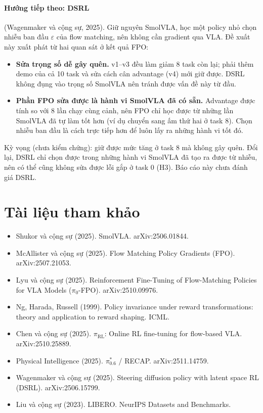 \documentclass[10pt,a4paper]{article}
\begin{document}
\paragraph{Hướng tiếp theo: DSRL} (Wagenmaker và cộng sự, 2025). Giữ nguyên SmolVLA, học một policy nhỏ chọn nhiễu ban đầu
$\varepsilon$ của flow matching, nên không cần gradient qua VLA. Đề xuất này xuất phát từ hai quan sát ở kết quả FPO:
\begin{itemize}
\item \textbf{Sửa trọng số dễ gây quên.} v1--v3 đều làm giảm 8 task còn lại; phải thêm demo của cả 10 task và sửa cách
cân advantage (v4) mới giữ được. DSRL không đụng vào trọng số SmolVLA nên tránh được vấn đề này từ đầu.
\item \textbf{Phần FPO sửa được là hành vi SmolVLA đã có sẵn.} Advantage được tính so với 8 lần chạy cùng cảnh, nên FPO
chỉ học được từ những lần SmolVLA đã tự làm tốt hơn (ví dụ chuyển sang ấm thứ hai ở task 8). Chọn nhiễu ban đầu là cách
trực tiếp hơn để luôn lấy ra những hành vi tốt đó.
\end{itemize}
Kỳ vọng (chưa kiểm chứng): giữ được mức tăng ở task 8 mà không gây quên. Đổi lại, DSRL chỉ chọn được trong những hành vi
SmolVLA đã tạo ra được từ nhiễu, nên có thể cũng không sửa được lỗi gắp ở task 0 (H3). Báo cáo này chưa đánh giá DSRL.


\section*{Tài liệu tham khảo}
{\scriptsize\raggedright
\begin{itemize}
\item Shukor và cộng sự (2025). SmolVLA. arXiv:2506.01844.
\item McAllister và cộng sự (2025). Flow Matching Policy Gradients (FPO). arXiv:2507.21053.
\item Lyu và cộng sự (2025). Reinforcement Fine-Tuning of Flow-Matching Policies for VLA Models ($\pi_0$-FPO). arXiv:2510.09976.
\item Ng, Harada, Russell (1999). Policy invariance under reward transformations: theory and application to reward shaping. ICML.
\item Chen và cộng sự (2025). $\pi_{\text{RL}}$: Online RL fine-tuning for flow-based VLA. arXiv:2510.25889.
\item Physical Intelligence (2025). $\pi^*_{0.6}$ / RECAP. arXiv:2511.14759.
\item Wagenmaker và cộng sự (2025). Steering diffusion policy with latent space RL (DSRL). arXiv:2506.15799.
\item Liu và cộng sự (2023). LIBERO. NeurIPS Datasets and Benchmarks.
\end{itemize}}
\end{document}
